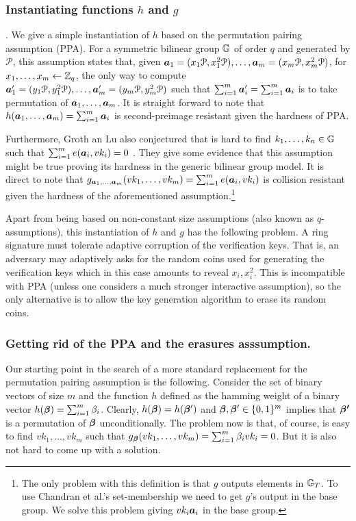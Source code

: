 
\subsubsection{Instantiating functions $h$ and $g$}. We give a simple instantiation of $h$ based on the permutation pairing assumption (PPA). For a symmetric bilinear group $\mathbb{G}$ of order $q$ and generated by $\mathcal{P}$, this assumption states that, given ${\boldsymbol{a}}_1 = (x_1\mathcal{P},x_1^2\mathcal{P}),\ldots,{\boldsymbol{a}}_m=(x_m\mathcal{P},x^2_m\mathcal{P})$, for $x_1,\ldots,x_m\gets\mathbb{Z}_q$, the only way to compute ${\boldsymbol{a}}'_1=(y_1\mathcal{P},y_1^2\mathcal{P}),\ldots,{\boldsymbol{a}}'_m=(y_m\mathcal{P},y_m^2\mathcal{P})$ such that $\sum_{i=1}^m {\boldsymbol{a}}'_i = \sum_{i=1}^m{\boldsymbol{a}}_i$ is to take permutation of ${\boldsymbol{a}}_1,\ldots,{\boldsymbol{a}}_m$.  It is straight forward to note that $h({\boldsymbol{a}}_1,\ldots,{\boldsymbol{a}}_m) = \sum_{i=1}^m {\boldsymbol{a}}_i$ is second-preimage resistant given the hardness of PPA.

Furthermore, Groth an Lu also conjectured that is hard to find $k_1,\ldots,k_n\in\mathbb{G}$ such that $\sum_{i=1}^m e({\boldsymbol{a}}_i,vk_i)=0$ \cite{AC:GroLu07}. They give some evidence that this assumption might be true proving its hardness in the generic bilinear group model. It is direct to note that $g_{{\boldsymbol{a}}_1,\ldots,{\boldsymbol{a}}_m}(vk_1,\ldots,vk_m) = \sum_{i=1}^m e({\boldsymbol{a}}_i,vk_i)$ is collision resistant given the hardness of the aforementioned assumption.\footnote{The only problem with this definition is that $g$ outputs elements in $\mathbb{G}_T$. To use Chandran et al.'s set-membership we need to get $g$'s output  in the base group. We solve this problem giving $vk_i{\boldsymbol{a}}_i$ in the base group.}

Apart from being based on non-constant size assumptions (also known as $q$-assumptions), this instantiation of $h$ and $g$ has the following problem. A ring signature must tolerate adaptive corruption of the verification keys. That is, an adversary may adaptively asks for the random coins used for generating the verification keys which in this case amounts to reveal $x_i,x_i^2$. This is incompatible with PPA (unless one considers a much stronger interactive assumption), so the only alternative is to allow the key generation algorithm to erase its random coins.

\subsubsection{Getting rid of the PPA and the erasures asssumption.} Our starting point in the search of a more standard replacement for the permutation pairing assumption is the following. Consider the set of binary vectors of size $m$ and the function $h$ defined as the hamming weight of a binary vector $h({\boldsymbol{\beta}}) = \sum_{i=1}^m \beta_i$. Clearly, $h({\boldsymbol{\beta}})=h({\boldsymbol{\beta}}')$ and ${\boldsymbol{\beta}},{\boldsymbol{\beta}}'\in\{0,1\}^m$ implies that ${\boldsymbol{\beta'}}$ is a permutation of ${\boldsymbol{\beta}}$ unconditionally.
The problem now is that, of course, is easy to find $vk_1,\ldots,{vk}_m$ such that $g_{\boldsymbol{\beta}}(vk_1,\ldots,vk_m) = \sum_{i=1}^m \beta_i vk_i = 0$. But it is also not hard to come up with a solution.

